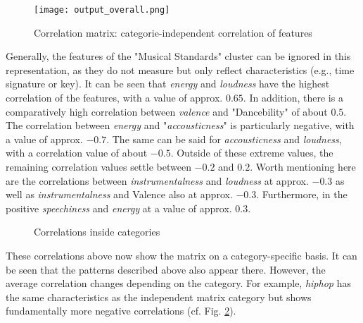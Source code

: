 \begin{figure}[H]
    \centering
    \caption[]{Correlation matrix: categorie-independent correlation of features}
	\label{fig:du_cm_overall}
    \texttt{[image: output\_overall.png]}
\end{figure}

Generally, the features of the "Musical Standards" cluster can be ignored in this representation,
as they do not measure but only reflect characteristics (e.g., time signature or key).
It can be seen that \emph{energy} and \emph{loudness} have the highest correlation of the features,
with a value of approx. \(0.65\).  
In addition, there is a comparatively high correlation between \emph{valence} and "Dancebility" of
about \(0.5\). 
The correlation between \emph{energy} and "\emph{accousticness}" is particularly negative, with a value of approx. \(-0.7\).
The same can be said for \emph{accousticness} and \emph{loudness}, with a correlation value of about \(-0.5\).
Outside of these extreme values, the remaining correlation values settle between \(-0.2\) and \(0.2\).
Worth mentioning here are the correlations between \emph{instrumentalness} and \emph{loudness} at
approx. \(-0.3\) as well as \emph{instrumentalness} and Valence also at approx. \(-0.3\). Furthermore,
in the positive \emph{speechiness} and \emph{energy} at a value of approx. \(0.3\).

\begin{figure}[H]
    \centering
    \qquad
    \qquad
    \caption{Correlations inside categories}%
    \label{fig:du_cm_categorie_dependent}%
\end{figure}

These correlations above now show the matrix on a category-specific basis.
It can be seen that the patterns described above also appear there.
However, the average correlation changes depending on the category.
For example, \emph{\emph{hiphop}} has the same characteristics as the independent matrix category but shows
fundamentally more negative correlations (cf. Fig. \ref{fig:du_cm_categorie_dependent}).

